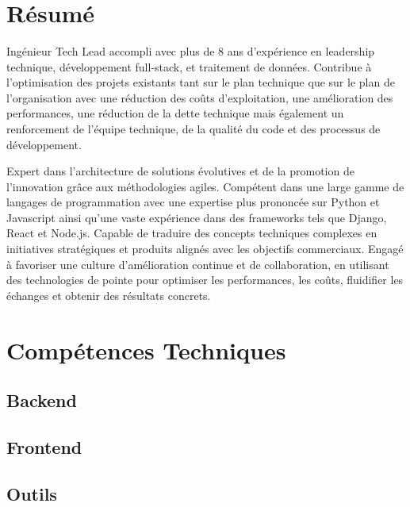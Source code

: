 \documentclass[11pt,a4paper,sans]{moderncv}
\title{\textnormal{\textls[150]{TECHLEAD ENGINEER}}} %
\begin{document}
\makecvtitle

\section{Résumé}
Ingénieur Tech Lead accompli avec plus de 8 ans d'expérience en leadership technique, développement full-stack, et traitement de données. Contribue à l'optimisation des projets existants 
tant sur le plan technique que sur le plan de l'organisation avec une réduction des coûts d'exploitation, une amélioration des performances, une réduction de la dette technique 
mais également un renforcement de l'équipe technique, de la qualité du code et des processus de développement.\\

\vspace{0.1cm}

Expert dans l'architecture de solutions évolutives et de la promotion de l'innovation grâce aux méthodologies agiles. Compétent dans une large gamme de langages de programmation avec une expertise plus prononcée sur Python et Javascript ainsi 
qu'une vaste expérience dans des frameworks tels que Django, React et Node.js. Capable de traduire des concepts techniques complexes en initiatives stratégiques et produits  
alignés avec les objectifs commerciaux. Engagé à favoriser une culture d'amélioration continue et de collaboration, 
en utilisant des technologies de pointe pour optimiser les performances, les coûts, fluidifier les échanges et obtenir des résultats concrets. 

\section{Compétences Techniques}
\subsection{Backend}

\subsection{Frontend}

\subsection{Outils}
\end{document}
